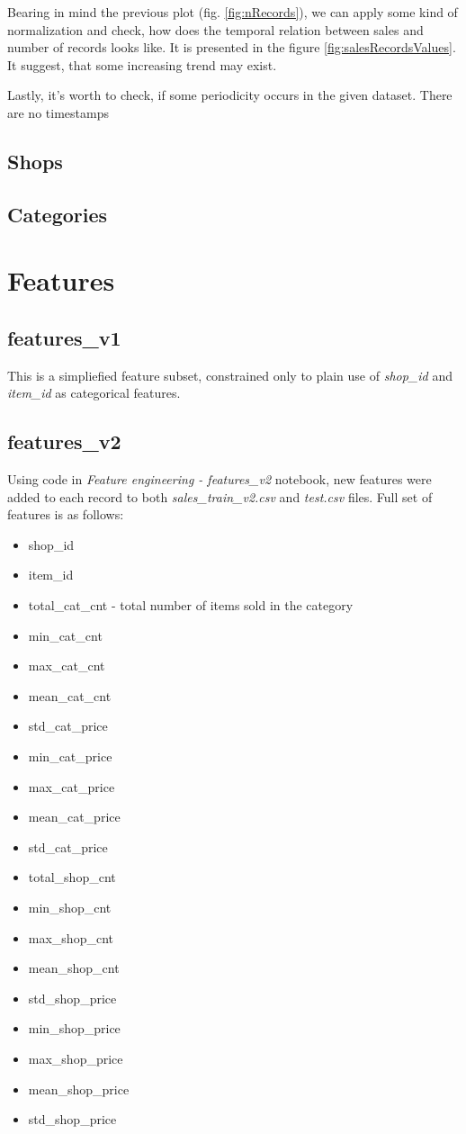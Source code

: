 \documentclass[12pt,twoside,a4paper]{memoir}
\begin{document}
	
 Bearing in mind the previous plot (fig. \ref{fig:nRecords}), we can apply some kind of normalization and check, how does the temporal relation between sales and number of records looks like. It is presented in the figure \ref{fig:salesRecordsValues}.
 It suggest, that some increasing trend may exist.

Lastly, it's worth to check, if some periodicity occurs in the given dataset. There are no timestamps

\subsection{Shops}

\subsection{Categories}


\section{Features}
\subsection{features\_v1}
This is a simpliefied feature subset, constrained only to plain use of \textit{shop\_id} and \textit{item\_id} as categorical features.

\subsection{features\_v2} \label{featv2}
Using code in \textit{Feature engineering - features\_v2} notebook, new features were added to each record to both \textit{sales\_train\_v2.csv} and \textit{test.csv} files.
Full set of features is as follows:
\begin{itemize}
\item shop\_id
\item item\_id
\item total\_cat\_cnt - total number of items sold in the category
\item min\_cat\_cnt
\item max\_cat\_cnt
\item mean\_cat\_cnt
\item std\_cat\_price
\item min\_cat\_price
\item max\_cat\_price
\item mean\_cat\_price
\item std\_cat\_price
\item total\_shop\_cnt
\item min\_shop\_cnt
\item max\_shop\_cnt
\item mean\_shop\_cnt
\item std\_shop\_price
\item min\_shop\_price
\item max\_shop\_price
\item mean\_shop\_price
\item std\_shop\_price
\end{itemize}
\end{document}
